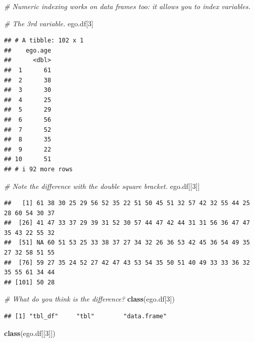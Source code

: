 \documentclass[
]{book}
\newenvironment{Shaded}{\begin{snugshade}}{\end{snugshade}}
\newcommand{\CommentTok}[1]{\textcolor[rgb]{0.56,0.35,0.01}{\textit{#1}}}
\newcommand{\DecValTok}[1]{\textcolor[rgb]{0.00,0.00,0.81}{#1}}
\newcommand{\FunctionTok}[1]{\textcolor[rgb]{0.13,0.29,0.53}{\textbf{#1}}}
\newcommand{\NormalTok}[1]{#1}
\begin{document}
\begin{Shaded}
\begin{Highlighting}[]
\CommentTok{\# Numeric indexing works on data frames too: it allows you to index variables.}

\CommentTok{\# The 3rd variable.}
\NormalTok{ego.df[}\DecValTok{3}\NormalTok{]}
\end{Highlighting}
\end{Shaded}

\begin{verbatim}
## # A tibble: 102 x 1
##    ego.age
##      <dbl>
##  1      61
##  2      38
##  3      30
##  4      25
##  5      29
##  6      56
##  7      52
##  8      35
##  9      22
## 10      51
## # i 92 more rows
\end{verbatim}

\begin{Shaded}
\begin{Highlighting}[]
\CommentTok{\# Note the difference with the double square bracket.}
\NormalTok{ego.df[[}\DecValTok{3}\NormalTok{]]}
\end{Highlighting}
\end{Shaded}

\begin{verbatim}
##   [1] 61 38 30 25 29 56 52 35 22 51 50 45 51 32 57 42 32 55 44 25 28 60 54 30 37
##  [26] 41 47 33 37 29 39 31 52 30 57 44 47 42 44 31 31 56 36 47 47 35 43 22 55 32
##  [51] NA 60 51 53 25 33 38 37 27 34 32 26 36 53 42 45 36 54 49 35 27 32 58 51 55
##  [76] 59 27 35 24 52 27 42 47 43 53 54 35 50 51 40 49 33 33 36 32 35 55 61 34 44
## [101] 50 28
\end{verbatim}

\begin{Shaded}
\begin{Highlighting}[]
\CommentTok{\# What do you think is the difference?}
\FunctionTok{class}\NormalTok{(ego.df[}\DecValTok{3}\NormalTok{])}
\end{Highlighting}
\end{Shaded}

\begin{verbatim}
## [1] "tbl_df"     "tbl"        "data.frame"
\end{verbatim}

\begin{Shaded}
\begin{Highlighting}[]
\FunctionTok{class}\NormalTok{(ego.df[[}\DecValTok{3}\NormalTok{]])}
\end{Highlighting}
\end{Shaded}
\end{document}
